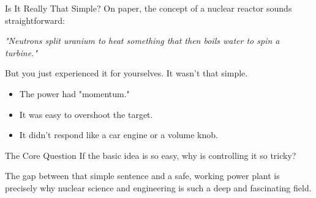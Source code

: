 \documentclass[aspectratio=169]{beamer}
\begin{document}

\begin{frame}[allowframebreaks]{Is It Really That Simple?}
    On paper, the concept of a nuclear reactor sounds straightforward:
    
    \vspace{1.5em}
    \begin{center}
        \textit{"Neutrons split uranium to heat something that then boils water to spin a turbine."}
    \end{center}
    \vspace{1.5em}

    But you just experienced it for yourselves. It wasn't that simple.
    \begin{itemize}
        \item The power had "momentum."
        \item It was easy to overshoot the target.
        \item It didn't respond like a car engine or a volume knob.
    \end{itemize}

    \vspace{1.5em}
    \begin{exampleblock}{The Core Question}
        If the basic idea is so easy, why is controlling it so tricky?
        
        The gap between that simple sentence and a safe, working power plant is precisely why nuclear science and engineering is such a deep and fascinating field.
    \end{exampleblock}
\end{frame}
\end{document}
